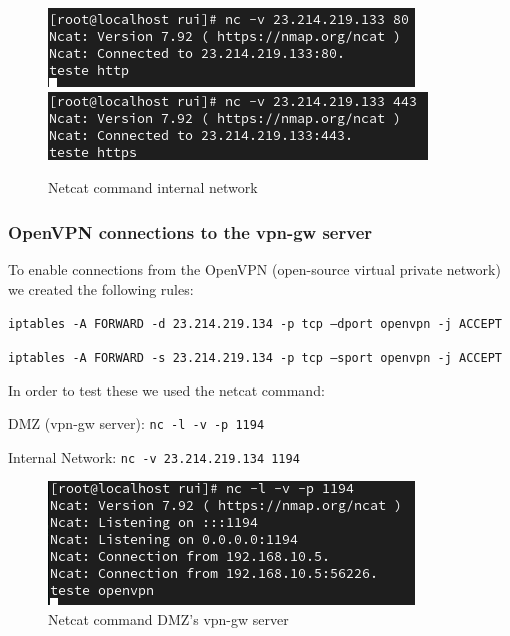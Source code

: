 \documentclass{article}
\begin{document}
\begin{figure}[H]
    \centering
    \includegraphics[scale=0.5]{btw/btw_http_internal.png}
    \includegraphics[scale=0.5]{btw/btw_https_internal.png}
    \caption{Netcat command internal network}
    \label{fig:network-arc}
\end{figure}


\subsubsection{OpenVPN connections to the vpn-gw server}

\quad To enable connections from the OpenVPN (open-source virtual private network) we created the following rules:

\texttt{}\par
\texttt{iptables -A FORWARD -d 23.214.219.134 -p tcp --dport openvpn -j ACCEPT}\par
\texttt{iptables -A FORWARD -s 23.214.219.134 -p tcp --sport openvpn -j ACCEPT}\par
\texttt{}\par


In order to test these we used the netcat command:
\texttt{}\par
\texttt{}\par
DMZ (vpn-gw server): \texttt{nc -l -v -p 1194} \par
Internal Network: \texttt{nc -v 23.214.219.134 1194} \par
\texttt{}\par
\begin{figure}[H]
    \centering
    \includegraphics[scale=0.5]{btw/btw_openvpn_dmz.png}
    \caption{Netcat command DMZ's vpn-gw server}
    \label{fig:network-arc}
\end{figure}
\end{document}
